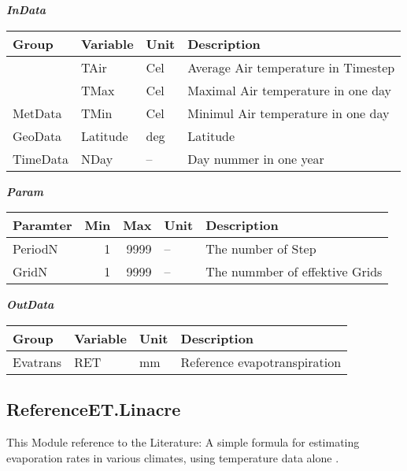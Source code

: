 \documentclass[
]{book}
\begin{document}
\textbf{\emph{InData}}

\begin{table}[!h]
\centering
\begin{tabular}{l|l|l|l}
\hline
Group & Variable & Unit & Description\\
\hline
 & TAir & Cel & Average Air temperature in Timestep\\
\cline{2-4}
 & TMax & Cel & Maximal Air temperature in one day\\
\cline{2-4}
\multirow{-3}{*}{\raggedright\arraybackslash MetData} & TMin & Cel & Minimul Air temperature in one day\\
\cline{1-4}
GeoData & Latitude & deg & Latitude\\
\cline{1-4}
TimeData & NDay & -- & Day nummer in one year\\
\hline
\end{tabular}
\end{table}

\textbf{\emph{Param}}

\begin{table}[!h]
\centering
\begin{tabular}{l|r|r|l|l}
\hline
Paramter & Min & Max & Unit & Description\\
\hline
PeriodN & 1 & 9999 & -- & The number of Step\\
\cline{1-5}
GridN & 1 & 9999 & -- & The nummber of effektive Grids\\
\hline
\end{tabular}
\end{table}

\textbf{\emph{OutData}}

\begin{table}[!h]
\centering
\begin{tabular}{l|l|l|l}
\hline
Group & Variable & Unit & Description\\
\hline
Evatrans & RET & mm & Reference evapotranspiration\\
\hline
\end{tabular}
\end{table}

\hypertarget{referenceet.linacre}{%
\subsection{ReferenceET.Linacre}\label{referenceet.linacre}}

This Module reference to the Literature: A simple formula for estimating evaporation rates in various climates, using temperature data alone \citep{Linacre.1977}.
\end{document}
